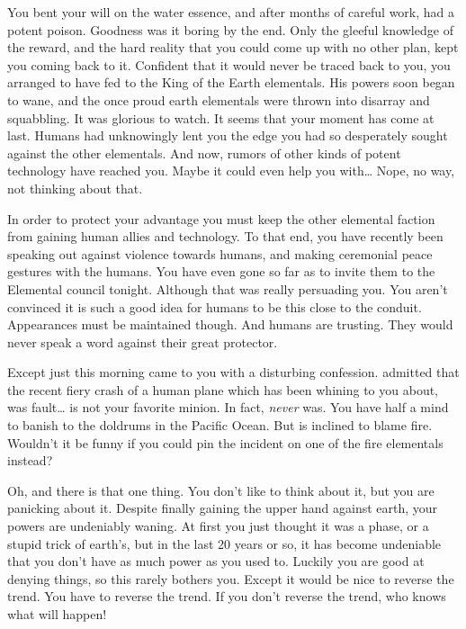 \documentclass[char]{elementals}
\begin{document}
You bent your will on the water essence, and after months of careful work, had a potent poison. Goodness was it boring by the end. Only the gleeful knowledge of the reward, and the hard reality that you could come up with no other plan, kept you coming back to it. Confident that it would never be traced back to you, you arranged to have fed to the King of the Earth elementals. His powers soon began to wane, and the once proud earth elementals were thrown into disarray and squabbling. It was glorious to watch. It seems that your moment has come at last. Humans had unknowingly lent you the edge you had so desperately sought against the other elementals. And now, rumors of other kinds of potent technology have reached you. Maybe it could even help you with{\ldots} Nope, no way, not thinking about that.

In order to protect your advantage you must keep the other elemental faction from gaining human allies and technology. To that end, you have recently been speaking out against violence towards humans, and making ceremonial peace gestures with the humans. You have even gone so far as to invite them to the Elemental council tonight. Although that was really \cNaturalist{} persuading you. You aren't convinced it is such a good idea for humans to be this close to the conduit. Appearances must be maintained though. And humans are trusting. They would never speak a word against their great protector.

Except just this morning \cNaturalist{} came to you with a disturbing confession. \cNaturalist{\They} admitted that the recent fiery crash of a human plane which \cLeader{} has been whining to you about, was \cNaturalist{\their} fault{\ldots} \cNaturalist{} is not your favorite minion. In fact, \cNaturalist{\They} \emph{never} was. You have half a mind to banish \cNaturalist{\their} to the doldrums in the Pacific Ocean. But \cLeader{} is inclined to blame fire. Wouldn't it be funny if you could pin the incident on one of the fire elementals instead?

Oh, and there is that one thing. You don't like to think about it, but you are panicking about it. Despite finally gaining the upper hand against earth, your powers are undeniably waning. At first you just thought it was a phase, or a stupid trick of earth's, but in the last 20 years or so, it has become undeniable that you don't have as much power as you used to. Luckily you are good at denying things, so this rarely bothers you. Except it would be nice to reverse the trend. You have to reverse the trend. If you don't reverse the trend, who knows what will happen!
\end{document}
